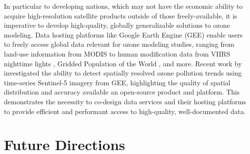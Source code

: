 \documentclass[gmd, manuscript]{copernicus}
\begin{document}
In particular to developing nations, which may not have the economic ability to acquire high-resolution satellite products outside of those freely-available, it is imperative to develop high-quality, globally generalizable solutions to ozone modeling. Data hosting platforms like Google Earth Engine (GEE) enable users to freely access global data relevant for ozone modeling studies, ranging from land-use information from MODIS \citep{Friedl2021} to human modification data from VIIRS nighttime lights \citep{Elvidge2017}, Gridded Population of the World \citep{CIESIN2018}, and more. Recent work by \citet{Garajeh2023} investigated the ability to detect spatially resolved ozone pollution trends using time-series Sentinel-5 imagery from GEE, highlighting the quality of spatial distribution and accuracy available an open-source product and platform. This demonstrates the necessity to co-design data services and their hosting platforms to provide efficient and performant access to high-quality, well-documented data. 


\section{Future Directions}



\end{document}
